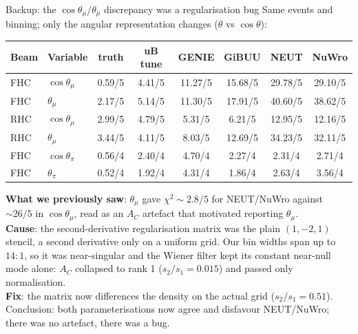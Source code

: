 \documentclass[aspectratio=169,10pt]{beamer}
\begin{document}
{\begin{frame}{Backup: the $\cos\theta_\mu$/$\theta_\mu$ discrepancy was a regularisation bug}
  \centering\footnotesize
  Same events and binning; only the angular representation changes ($\theta$ vs $\cos\theta$):
  \begin{center}\scriptsize
  \begin{tabular}{llcccccc}
  \toprule
  Beam & Variable & truth & uB tune & GENIE & GiBUU & NEUT & NuWro\\\midrule
  FHC & $\cos\theta_\mu$ & 0.59/5 & 4.41/5 & 11.27/5 & 15.68/5 & \alert{29.78/5} & \alert{29.10/5}\\
  FHC & $\theta_\mu$     & 2.17/5 & 5.14/5 & 11.30/5 & 17.91/5 & \alert{40.60/5} & \alert{38.62/5}\\\midrule
  RHC & $\cos\theta_\mu$ & 2.99/5 & 4.79/5 & 5.31/5 & 6.21/5 & \alert{12.95/5} & \alert{12.16/5}\\
  RHC & $\theta_\mu$     & 3.44/5 & 4.11/5 & 8.03/5 & 12.69/5 & \alert{34.23/5} & \alert{32.11/5}\\\midrule
  FHC & $\cos\theta_\pi$ & 0.56/4 & 2.40/4 & 4.70/4 & 2.27/4 & 2.31/4 & 2.71/4\\
  FHC & $\theta_\pi$     & 0.52/4 & 1.92/4 & 4.31/4 & 1.86/4 & 2.63/4 & 3.56/4\\
  \bottomrule
  \end{tabular}
  \end{center}
  \vspace{1mm}
  {\scriptsize \textbf{What we previously saw}: $\theta_\mu$ gave $\chi^2\!\sim\!2.8/5$ for NEUT/NuWro against $\sim\!26/5$ in $\cos\theta_\mu$, read as an $A_C$ artefact that motivated reporting $\theta_\mu$.\\
  \textbf{Cause}: the second-derivative regularisation matrix was the plain $(1,-2,1)$ stencil, a second derivative only on a \alert{uniform} grid. Our bin widths span up to $14{:}1$, so it was near-singular and the Wiener filter kept its constant near-null mode alone: $A_C$ collapsed to \alert{rank 1} ($s_2/s_1=0.015$) and passed only normalisation.\\
  \textbf{Fix}: the matrix now differences the density on the actual grid ($s_2/s_1=0.51$). \alert{Conclusion}: both parameterisations now agree and disfavour NEUT/NuWro; there was no artefact, there was a bug.}
\end{frame}

}
\end{document}
